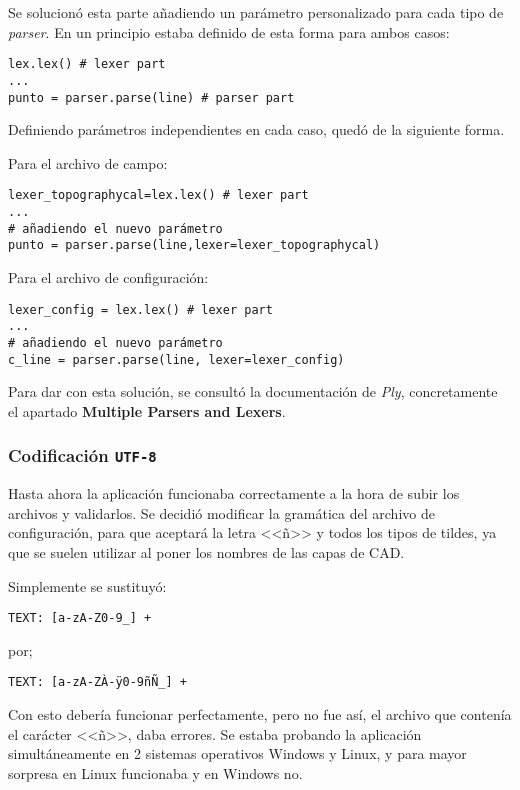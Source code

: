 Se solucionó esta parte añadiendo un parámetro personalizado para cada tipo de \emph{parser}. En un principio estaba definido de esta forma para ambos casos:

\begin{verbatim}
lex.lex() # lexer part
...
punto = parser.parse(line) # parser part
\end{verbatim}

Definiendo parámetros independientes en cada caso, quedó de la siguiente forma.

Para el archivo de campo:

\begin{verbatim}
lexer_topographycal=lex.lex() # lexer part
...
# añadiendo el nuevo parámetro
punto = parser.parse(line,lexer=lexer_topographycal)
\end{verbatim}

Para el archivo de configuración:

\begin{verbatim}
lexer_config = lex.lex() # lexer part
...
# añadiendo el nuevo parámetro
c_line = parser.parse(line, lexer=lexer_config)
\end{verbatim}
Para dar con esta solución, se consultó la documentación de \emph{Ply}, concretamente el apartado \textbf{Multiple Parsers and Lexers}\cite{Parser}.


\subsubsection{Codificación \texttt{UTF-8}}

Hasta ahora la aplicación funcionaba correctamente a la hora de subir los archivos y validarlos. Se decidió modificar la gramática del archivo de configuración, para que aceptará la letra <<ñ>> y todos los tipos de tildes, ya que se suelen utilizar al poner los nombres de las capas de CAD. 

Simplemente se sustituyó:

\begin{verbatim}
TEXT: [a-zA-Z0-9_] +
\end{verbatim}

por; 

\begin{verbatim}
TEXT: [a-zA-ZÀ-ÿ0-9ñÑ_] +
\end{verbatim}

Con esto debería funcionar perfectamente, pero no fue así, el archivo que contenía el carácter <<ñ>>, daba errores. Se estaba probando la aplicación simultáneamente en 2 sistemas operativos Windows y Linux, y para mayor sorpresa en Linux funcionaba y en Windows no.

